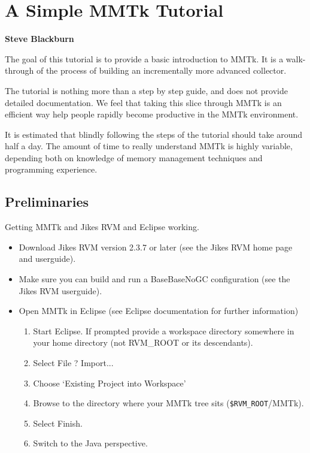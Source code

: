 \documentclass[textsize=14pt]{article}
\newcommand{\env}[1]{\texttt{\$#1}}
\newcommand{\file}[1]{\textsf{#1}}
\newcommand{\menu}[0]{?}
\begin{document}
\section{A Simple MMTk Tutorial}

\textbf{Steve Blackburn}

The goal of this tutorial is to provide a basic introduction to
MMTk. It is a walk-through of the process of building an
incrementally more advanced collector.

The tutorial is nothing more than a step by step guide, and does not
provide detailed documentation. We feel that taking this slice
through MMTk is an efficient way help people rapidly become
productive in the MMTk environment.

It is estimated that blindly following the steps of the tutorial
should take around half a day. The amount of time to really
understand MMTk is highly variable, depending both on knowledge of
memory management techniques and programming experience.

\subsection{Preliminaries}

Getting MMTk and Jikes RVM and Eclipse working.

\begin{itemize}
\item Download Jikes RVM version 2.3.7 or later (see the Jikes RVM
home page and userguide).

\item Make sure you can build and run a BaseBaseNoGC configuration
(see the Jikes RVM userguide).

\item Open MMTk in Eclipse (see Eclipse documentation for further
information)
\begin{enumerate}
    \item Start Eclipse. If prompted provide a workspace directory
    somewhere in your home directory (not RVM\_ROOT or its
    descendants).
    \item Select File \menu{} Import...
    \item Choose `Existing Project into Workspace'
    \item Browse to the directory where your MMTk tree
    sits (\file{\env{RVM\_ROOT}/MMTk}).
    \item Select Finish.
    \item Switch to the Java perspective.
\end{enumerate}
\end{itemize}
\end{document}
